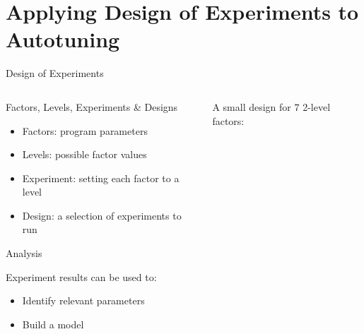 \documentclass[10pt, compress, aspectratio=169, xcolor={table,usenames,dvipsnames}]{beamer}
\begin{document}
\section{Applying Design of Experiments to Autotuning}
\label{sec:orged35df7}
\begin{frame}[label={sec:orgbf28cda}]{Design of Experiments}
\begin{columns}
\begin{column}{0.5\columnwidth}
\begin{block}{Factors, Levels, Experiments \& Designs}
\vspace{.2cm}

\begin{itemize}
\item \alert{Factors}: program \alert{parameters}
\item \alert{Levels}: possible factor \alert{values}
\item \alert{Experiment}: setting each factor to a level
\item \alert{Design}: a \alert{selection} of experiments to \alert{run}
\end{itemize}

\begin{block}{Analysis}
\vspace{.2cm}

\alert{Experiment results} can be used to:

\begin{itemize}
\item Identify \alert{relevant parameters}
\item Build a \alert{model}
\end{itemize}
\end{block}
\end{block}
\end{column}

\begin{column}{0.5\columnwidth}
\vspace{.4cm}

A \alert{small design} for \(7\) \alert{2-level factors}:

\vspace{.2cm}


\end{column}
\end{columns}
\end{frame}
\end{document}
